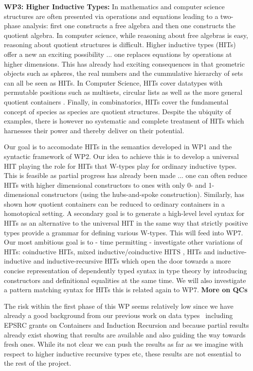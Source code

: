 \documentclass[a4paper,11pt]{article}
\begin{document}
{\bf WP3: Higher Inductive Types:} In mathematics and computer science
structures are often presented via operations and equations leading to
a two-phase analysis: first one constructs a free algebra and then one
constructs the quotient algebra. In computer science, while reasoning
about free algebras is easy, reasoning about quotient structures is
difficult. Higher inductive types (HITs) offer a new an exciting
possibility ... one replaces equations by operations at higher
dimensions. This has already had exciting consequences in that
geometric objects such as spheres, the real numbers and the
cummulative hierarchy of sets can all be seen as HITs.  In Computer
Science, HITs cover datatypes with permutable positions such as
multisets, circular lists as well as the more general quotient
containers \cite{abottAltenGhaniMcB:quotientContainers, EPSRC
  Containers}. Finally, in combinatorics, HITs cover the fundamental
concept of species as species are quotient structures. Despite the
ubiquity of examples, there is however no systematic and complete
treatment of HITs which harnesses their power and thereby deliver on
their potential.

Our goal is to accomodate HITs in the semantics developed in WP1 and
the syntactic framework of WP2. Our idea to achieve this is to develop
a universal HIT playing the role for HITs that W-types play for
ordinary inductive types. This is feasible as partial progress has
already been made ... one can often reduce HITs with higher
dimensional constructors to ones with only 0- and 1-dimensional
constructors (using the hubs-and-spoke construction). 
Similarly, \cite{gylterud:thesis,kock:groupoids} has shown how quotient 
containers can be reduced to ordinary containers in a homotopical 
setting. A secondary goal
is to generate a high-level level syntax for HITs as an alternative to
the universal HIT in the same way that strictly positive types provide
a grammar for defining various W-types. This will feed into WP7.  Our
most ambitious goal is to - time permitting - investigate other
variations of HITs: coinductive HITs, mixed inductive/coinductive HITS
\cite{txa-nisse}, HITs and inductive-inductive and inductive-recursive
HITs which open the door towards a more concise representation of
dependently typed syntax in type theory \cite{chapman2009type} by
introducing constructors and definitional equalities at the same
time. We will also investigate a pattern matching syntax for HITs this
is related again to WP7. {\bf More on QCs}


The risk within the first phase of this WP seems relatively low since we
have already a good background from our previous work on data
types~\cite{II etc} including EPSRC grants on Containers and Induction
Recursion and because partial results already exist showing that
results are available and also guiding the way towards fresh
ones. While its not clear we can push the results as far as we imagine
with respect to higher inductive recursive types etc, these results
are not essential to the rest of the project.
\end{document}
